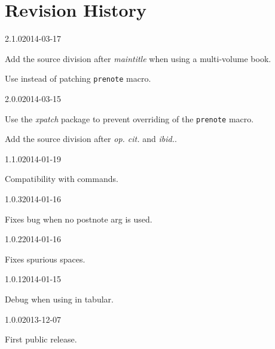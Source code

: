 \documentclass{ltxdockit}[2011/03/25]
\begin{document}
\section{Revision History}
\begin{changelog}

\begin{release}{2.1.0}{2014-03-17}
\item Add the source division after \emph{maintitle} when using a multi-volume book.
\item Use  instead of patching \verb+prenote+ macro.
\end{release}


\begin{release}{2.0.0}{2014-03-15}
\item Use the \emph{xpatch} package to prevent overriding of the  \verb+prenote+ macro.
\item Add the source division after \emph{op. cit.} and \emph{ibid.}.
\end{release}


\begin{release}{1.1.0}{2014-01-19}
\item Compatibility with  commands.
\end{release}

\begin{release}{1.0.3}{2014-01-16}
\item Fixes bug when no postnote arg is used.
\end{release}

\begin{release}{1.0.2}{2014-01-16}
\item Fixes spurious spaces.
\end{release}

\begin{release}{1.0.1}{2014-01-15}
\item Debug when using in tabular.
\end{release}


\begin{release}{1.0.0}{2013-12-07}
\item First public release.
\end{release}

\end{changelog}
\end{document}
